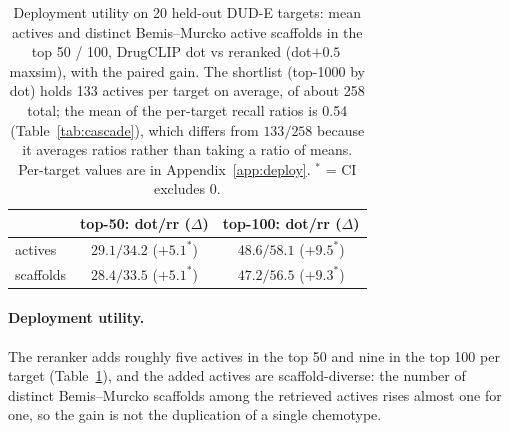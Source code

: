 \documentclass[10pt,letterpaper,twocolumn]{article}
\begin{document}
\begin{table}[t]
\centering
\footnotesize
\setlength{\tabcolsep}{3pt}
\caption{Deployment utility on 20 held-out DUD-E targets: mean actives and distinct Bemis--Murcko active scaffolds in the top 50 / 100, DrugCLIP dot vs reranked (dot$+0.5$\,maxsim), with the paired gain. The shortlist (top-1000 by dot) holds 133 actives per target on average, of about 258 total; the mean of the per-target recall ratios is 0.54 (Table~\ref{tab:cascade}), which differs from $133/258$ because it averages ratios rather than taking a ratio of means. Per-target values are in Appendix~\ref{app:deploy}. $^{*}$ = CI excludes 0.}
\label{tab:utility}
\begin{tabular}{@{}lcc@{}}
\toprule
 & top-50: dot/rr ($\Delta$) & top-100: dot/rr ($\Delta$) \\
\midrule
actives & $29.1/34.2$ ($+5.1^{*}$) & $48.6/58.1$ ($+9.5^{*}$) \\
scaffolds & $28.4/33.5$ ($+5.1^{*}$) & $47.2/56.5$ ($+9.3^{*}$) \\
\bottomrule
\end{tabular}
\end{table}

\paragraph{Deployment utility.} The reranker adds roughly five actives in the top 50 and nine in the top 100 per target (Table~\ref{tab:utility}), and the added actives are scaffold-diverse: the number of distinct Bemis--Murcko scaffolds among the retrieved actives rises almost one for one, so the gain is not the duplication of a single chemotype.
\end{document}

